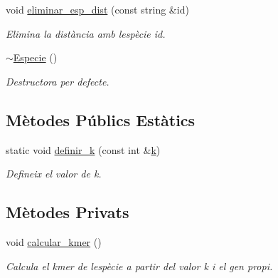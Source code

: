 \begin{DoxyCompactItemize}
void \hyperlink{class_especie_a2a63fa33f9297beec7b57a86fe55ce2a}{eliminar\+\_\+esp\+\_\+dist} (const string \&id)
\begin{DoxyCompactList}\small\item\em Elimina la distància amb l\textquotesingle{}espècie id. \end{DoxyCompactList}\item 
\hyperlink{class_especie_abd21378dde6e8348d823c6f87a1c0658}{$\sim$\+Especie} ()
\begin{DoxyCompactList}\small\item\em Destructora per defecte. \end{DoxyCompactList}\end{DoxyCompactItemize}
\subsection*{Mètodes Públics Estàtics}
\begin{DoxyCompactItemize}
\item 
static void \hyperlink{class_especie_a30e274da0f6d1ee4c450702a3f914ecf}{definir\+\_\+k} (const int \&\hyperlink{class_especie_a592c0ddeeebc786969f3040fbefea9df}{k})
\begin{DoxyCompactList}\small\item\em Defineix el valor de k. \end{DoxyCompactList}\end{DoxyCompactItemize}
\subsection*{Mètodes Privats}
\begin{DoxyCompactItemize}
\item 
void \hyperlink{class_especie_ae0e15597807d18f35773c9071c2913c8}{calcular\+\_\+kmer} ()
\begin{DoxyCompactList}\small\item\em Calcula el kmer de l\textquotesingle{}espècie a partir del valor k i el gen propi. \end{DoxyCompactList}\end{DoxyCompactItemize}
